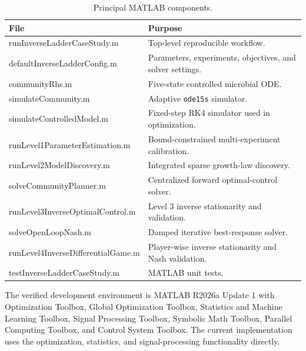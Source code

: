 \documentclass[11pt,a4paper]{article}
\begin{document}
\begin{table}[H]
\centering
\caption{Principal MATLAB components.}
\label{tab:software}
\begin{tabularx}{\textwidth}{>{\ttfamily}l X}
\toprule
\normalfont File & Purpose\\
\midrule
runInverseLadderCaseStudy.m & Top-level reproducible workflow.\\
defaultInverseLadderConfig.m & Parameters, experiments, objectives, and solver settings.\\
communityRhs.m & Five-state controlled microbial ODE.\\
simulateCommunity.m & Adaptive \texttt{ode15s} simulator.\\
simulateControlledModel.m & Fixed-step RK4 simulator used in optimization.\\
runLevel1ParameterEstimation.m & Bound-constrained multi-experiment calibration.\\
runLevel2ModelDiscovery.m & Integrated sparse growth-law discovery.\\
solveCommunityPlanner.m & Centralized forward optimal-control solver.\\
runLevel3InverseOptimalControl.m & Level 3 inverse stationarity and validation.\\
solveOpenLoopNash.m & Damped iterative best-response solver.\\
runLevel4InverseDifferentialGame.m & Player-wise inverse stationarity and Nash validation.\\
testInverseLadderCaseStudy.m & MATLAB unit tests.\\
\bottomrule
\end{tabularx}
\end{table}

The verified development environment is MATLAB R2026a Update 1 with
Optimization Toolbox, Global Optimization Toolbox, Statistics and Machine
Learning Toolbox, Signal Processing Toolbox, Symbolic Math Toolbox, Parallel
Computing Toolbox, and Control System Toolbox. The current implementation uses
the optimization, statistics, and signal-processing functionality directly.
\end{document}
